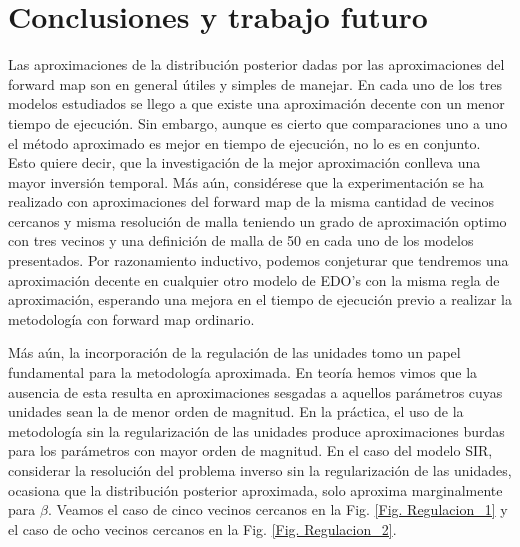 \chapter{Conclusiones y trabajo futuro}

Las aproximaciones de la distribución posterior dadas por las aproximaciones del forward map son en general útiles y simples de manejar. En cada uno de los tres modelos estudiados se llego a que existe una aproximación decente con un menor tiempo de ejecución. Sin embargo, aunque es cierto que comparaciones uno a uno el método aproximado es mejor en tiempo de ejecución, no lo es en conjunto. Esto quiere decir, que la investigación de la mejor aproximación conlleva una mayor inversión temporal. 
Más aún, considérese que la experimentación se ha realizado con aproximaciones del forward map de la misma cantidad de vecinos cercanos y misma resolución de malla teniendo un grado de aproximación optimo con tres vecinos y una definición de malla de 50  en cada uno de los modelos presentados. Por razonamiento inductivo, podemos conjeturar que tendremos una aproximación decente en cualquier otro modelo de EDO's con la misma regla de aproximación, esperando una mejora en el tiempo de ejecución previo a realizar la metodología con forward map ordinario.

Más aún, la incorporación de la regulación de las unidades tomo un papel fundamental para la metodología aproximada. En teoría hemos vimos que la ausencia de esta resulta en aproximaciones sesgadas a aquellos parámetros cuyas unidades sean la de menor orden de magnitud. En la práctica, el uso de la metodología sin la regularización de las unidades produce aproximaciones burdas para los parámetros con mayor orden de magnitud. En el caso del modelo SIR, considerar la resolución del problema inverso sin la regularización de las unidades, ocasiona que la distribución posterior aproximada, solo aproxima marginalmente para $\beta$. Veamos el caso de cinco vecinos cercanos en la Fig. \ref{Fig. Regulacion_1}
y el caso de ocho vecinos cercanos en la Fig. \ref{Fig. Regulacion_2}.

